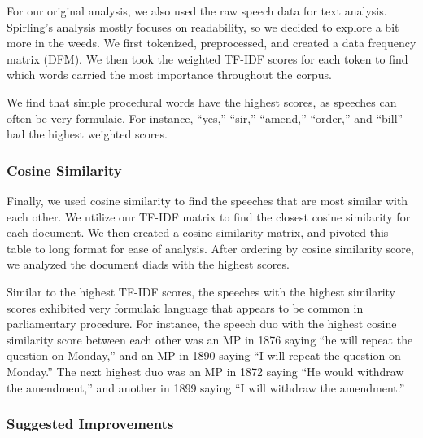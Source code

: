 \documentclass[
  letterpaper,
  DIV=11,
  numbers=noendperiod]{scrartcl}
\begin{document}
For our original analysis, we also used the raw speech data for text
analysis. Spirling's analysis mostly focuses on readability, so we
decided to explore a bit more in the weeds. We first tokenized,
preprocessed, and created a data frequency matrix (DFM). We then took
the weighted TF-IDF scores for each token to find which words carried
the most importance throughout the corpus.

We find that simple procedural words have the highest scores, as
speeches can often be very formulaic. For instance, ``yes,'' ``sir,''
``amend,'' ``order,'' and ``bill'' had the highest weighted scores.

\subsubsection{Cosine Similarity}\label{cosine-similarity}

Finally, we used cosine similarity to find the speeches that are most
similar with each other. We utilize our TF-IDF matrix to find the
closest cosine similarity for each document. We then created a cosine
similarity matrix, and pivoted this table to long format for ease of
analysis. After ordering by cosine similarity score, we analyzed the
document diads with the highest scores.

Similar to the highest TF-IDF scores, the speeches with the highest
similarity scores exhibited very formulaic language that appears to be
common in parliamentary procedure. For instance, the speech duo with the
highest cosine similarity score between each other was an MP in 1876
saying ``he will repeat the question on Monday,'' and an MP in 1890
saying ``I will repeat the question on Monday.'' The next highest duo
was an MP in 1872 saying ``He would withdraw the amendment,'' and
another in 1899 saying ``I will withdraw the amendment.''

\subsubsection{Suggested Improvements}\label{suggested-improvements}
\end{document}

